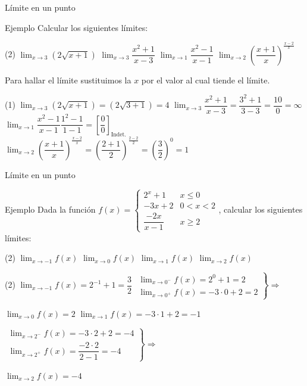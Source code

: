 \documentclass[8pt]{beamer}
\newcommand{\limite}[2]{\displaystyle \lim_{x \rightarrow #1}{#2}}
\begin{document}
\begin{frame}{Límite en un punto}
\begin{exampleblock}{Ejemplo}
Calcular los siguientes límites:
\begin{tasks}[label=\alph*)](2)
\task $\limite{3}{\left( 2 \sqrt{x+1} \right)}$
\task $\limite{3}{\dfrac{x^2+1}{x-3}}$
\task $\limite{1}{\dfrac{x^2-1}{x-1}}$
\task $\limite{2}{\left( \dfrac{x+1}{x} \right)^{\frac{x-2}{x}}}$
\end{tasks}
\end{exampleblock}
Para hallar el límite sustituimos la $x$ por el valor al cual tiende el límite.
\begin{tasks}[label=\alph*)](1)
\task $\limite{3}{\left( 2 \sqrt{x+1} \right)}= \left( 2 \sqrt{3+1} \right)= 4 $
\task $\limite{3}{\dfrac{x^2+1}{x-3}}=\dfrac{3^2+1}{3-3}=\dfrac{10}{0} = \infty$
\task $\limite{1}{\dfrac{x^2-1}{x-1}}\dfrac{1^2-1}{1-1}=\left[\dfrac{0}{0}\right]_{\text{Indet.}}$
\task $\limite{2}{\left( \dfrac{x+1}{x} \right)^{\frac{x-2}{x}}}=\left( \dfrac{2+1}{2} \right)^{\frac{2-2}{2}}=\left( \dfrac{3}{2} \right)^{0}=1$
\end{tasks}
\end{frame}

\begin{frame}{Límite en un punto}
\begin{exampleblock}{Ejemplo}
Dada la función $f(x)=\begin{cases} 2^x+1 & x \leq 0 \\ -3x+2 & 0 <x < 2 \\  \dfrac{-2x}{x-1} & x \geq 2\end{cases} $, calcular los siguientes límites:
\begin{tasks}[label=\alph*)](2)
\task $\limite{-1}{f(x)}$
\task $\limite{0}{f(x)}$
\task $\limite{1}{f(x)}$
\task $\limite{2}{f(x)}$
\end{tasks}
\end{exampleblock}

\begin{tasks}[label=\alph*)](2)
\task $\limite{-1}{f(x)}= 2^{-1}+1=\dfrac{3}{2}$
\task 
$\left. \begin{array}{l} \limite{0^{-}}{f(x)} = 2^0+1
=2 \\ \limite{0^{+}}{f(x)}= -3 \cdot 0 +2 = 2 
\end{array} \right\rbrace \Rightarrow$

$ \limite{0}{f(x)}=2 $
\task $\limite{1}{f(x)}=-3 \cdot 1 +2 = -1$

\task 
$\left. \begin{array}{l} \limite{2^{-}}{f(x)} = -3 \cdot 2 +2
=-4 \\ \limite{2^{+}}{f(x)}= \dfrac{-2 \cdot 2}{2-1} = -4 
\end{array} \right\rbrace \Rightarrow$

$ \limite{2}{f(x)}=-4 $
\end{tasks}
\end{frame}
\end{document}
